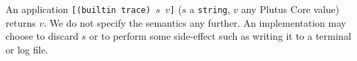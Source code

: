 \label{note:trace}
An application \texttt{[(builtin trace) $s$ $v$]} ($s$ a \texttt{string}, $v$
any Plutus Core value) returns $v$.  We do not specify the semantics any
further.  An implementation may choose to discard $s$ or to perform some
side-effect such as writing it to a terminal or log file.

\newpage
